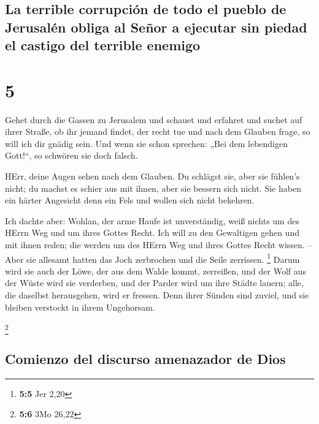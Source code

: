 \hypertarget{la-terrible-corrupciuxf3n-de-todo-el-pueblo-de-jerusaluxe9n-obliga-al-seuxf1or-a-ejecutar-sin-piedad-el-castigo-del-terrible-enemigo}{%
\subsection{La terrible corrupción de todo el pueblo de Jerusalén obliga
al Señor a ejecutar sin piedad el castigo del terrible
enemigo}\label{la-terrible-corrupciuxf3n-de-todo-el-pueblo-de-jerusaluxe9n-obliga-al-seuxf1or-a-ejecutar-sin-piedad-el-castigo-del-terrible-enemigo}}

\hypertarget{section-4}{%
\section{5}\label{section-4}}

 Gehet durch die Gassen zu Jerusalem und schauet und
erfahret und suchet auf ihrer Straße, ob ihr jemand findet, der recht
tue und nach dem Glauben frage, so will ich dir gnädig sein.
 Und wenn sie schon sprechen: „Bei dem lebendigen
Gott!{}``, so schwören sie doch falsch.

 HErr, deine Augen sehen nach dem Glauben. Du schlägst
sie, aber sie fühlen's nicht; du machst es schier aus mit ihnen, aber
sie bessern sich nicht. Sie haben ein härter Angesicht denn ein Fels und
wollen sich nicht bekehren.

 Ich dachte aber: Wohlan, der arme Haufe ist unverständig,
weiß nichts um des HErrn Weg und um ihres Gottes Recht. 
Ich will zu den Gewaltigen gehen und mit ihnen reden; die werden um des
HErrn Weg und ihres Gottes Recht wissen. -- Aber sie allesamt hatten das
Joch zerbrochen und die Seile zerrissen. \footnote{\textbf{5:5} Jer 2,20}
 Darum wird sie auch der Löwe, der aus dem Walde kommt,
zerreißen, und der Wolf aus der Wüste wird sie verderben, und der Parder
wird um ihre Städte lauern; alle, die daselbst herausgehen, wird er
fressen. Denn ihrer Sünden sind zuviel, und sie bleiben verstockt in
ihrem Ungehorsam.

\footnote{\textbf{5:6} 3Mo 26,22}

\hypertarget{comienzo-del-discurso-amenazador-de-dios}{%
\subsection{Comienzo del discurso amenazador de
Dios}\label{comienzo-del-discurso-amenazador-de-dios}}

